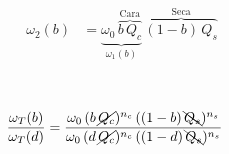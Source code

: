 \documentclass[a4paper,10pt]{article}
\begin{document}
\begin{figure}[ht!]
 \centering
 \begin{subfigure}[b]{0.44\textwidth}
 \begin{equation*}
\begin{split}
\omega_2(b) & = \underbrace{\omega_0 \, \overbrace{b \,  Q_c}^{\text{Cara}}}_{\omega_1(b)} \, \overbrace{(1-b) \, Q_s}^{\text{Seca}}
\end{split}
\end{equation*}
 \end{subfigure}
 \
 \begin{subfigure}[b]{0.54\textwidth}
  \begin{equation}
\begin{split}
& \frac{\omega_T(b)}{\omega_T(d)} = \frac{\omega_0 \,  (b \,  \cancel{Q_c})^{n_c}  \,  ((1-b) \, \bcancel{Q_s})^{n_s}}{\omega_0 \,   (d \,  \cancel{Q_c})^{n_c}  \,  ((1-d) \, \bcancel{Q_s})^{n_s}}
\end{split}
\end{equation}
 \end{subfigure}
\end{figure}
\vspace{-0.1cm}

%
\end{document}
